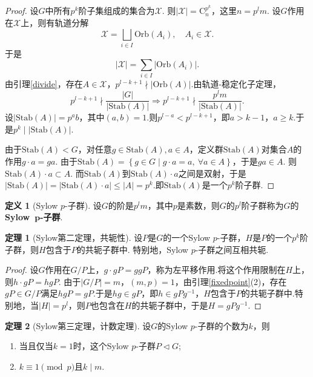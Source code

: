 \documentclass[12pt]{ctexart}
\theoremstyle{definition}
\newtheorem{definition}{定义}[section]
\newtheorem{theorem}{定理}[section]
\theoremstyle{plain}
\newcommand{\Orb}{\mathrm{Orb}}
\newcommand{\Stab}{\mathrm{Stab}}
\begin{document}
\begin{proof}
	设$G$中所有$p^k$阶子集组成的集合为$\mathcal{X}$. 则$|\mathcal{X}|=\mathrm{C}_{n}^{p^k}$，这里$n=p^lm$.
	设$G$作用在$\mathcal{X}$上，则有轨道分解
	$$\mathcal{X}=\bigsqcup_{i\in I}\Orb(A_i),\quad A_i\in\mathcal{X}.$$
	于是
	$$|\mathcal{X}|=\sum_{i\in I}|\Orb(A_i)|.$$
	由引理\ref{divide}，存在$A\in\mathcal{X}$，$p^{l-k+1}\nmid|\Orb(A)|$.由轨道-稳定化子定理，
	$$p^{l-k+1}\nmid \frac{|G|}{|\Stab(A)|}\Rightarrow p^{l-k+1}\nmid\frac{p^lm}{|\Stab(A)|}.$$
	设$|\Stab(A)|=p^ab$，其中$(a,b)=1$.则$p^{l-a}<p^{l-k+1}$，即$a>k-1$，$a\geqslant k$.于是$p^k\mid|\Stab(A)|$.
	
	由于$\Stab(A)<G$，对任意$g\in\Stab(A),a\in A$，定义群$\Stab(A)$对集合$A$的作用$g\cdot a=ga$. 由于$\Stab(A)=\left\{g\in G\mid g\cdot a=a,\ \forall a\in A\right\}$，于是$ga\in A$. 则$\Stab(A)\cdot a\subset A$. 而$\Stab(A)$到$\Stab(A)\cdot a$之间是双射，于是$|\Stab(A)|=|\Stab(A)\cdot a|\leqslant|A|=p^k$.即$\Stab(A)$是一个$p^k$阶子群.
\end{proof}
\begin{definition}[Sylow $p$-子群]
	设$G$的阶是$p^lm$，其中$p$是素数，则$G$的$p^l$阶子群称为$G$的\textbf{Sylow\ $\boldsymbol{p}$-子群}.
\end{definition}
\begin{theorem}[Sylow第二定理，共轭性]
	设$P$是$G$的一个Sylow $p$-子群，$H$是$P$的一个$p^k$阶子群，则$H$包含于$P$的共轭子群中. 特别地，Sylow $p$-子群之间互相共轭.
\end{theorem}
\begin{proof}
	设$G$作用在$G/P$上，$g\cdot gP=ggP$，称为左平移作用.将这个作用限制在$H$上，则$h\cdot gP=hgP$. 由于$|G/P|=m$，$(m,p)=1$，由引理\ref{fixedpoint}(2)，存在$gP\in G/P$满足$hgP=gP$.于是$hg\in gP$，即$h\in gPg^{-1}$，$H$包含于$P$的共轭子群中.特别地，当$|H|=p^l$，则$P$也包含在$H$的共轭子群中，于是$H=gPg^{-1}$.
\end{proof}
\begin{theorem}[Sylow第三定理，计数定理]
	设$G$的Sylow $p$-子群的个数为$k$，则
	\begin{enumerate}[(1)]
		\item 当且仅当$k=1$时，这个Sylow $p$-子群$P\lhd G$;
		\item $k\equiv 1\pmod p$且$k\mid m$.
	\end{enumerate}
\end{theorem}
\end{document}
